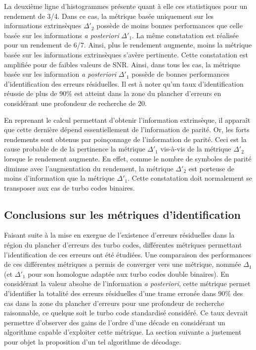 La deuxième ligne d'histogrammes présente quant à elle ces statistiques  pour un rendement de 3/4. Dans ce cas, la 
métrique basée uniquement sur les informations extrinsèques $\Delta'_2$ possède de moins bonnes performances que celle basée sur les 
informations \textit{a posteriori} $\Delta'_1$. La même constatation est réalisée pour un rendement de 6/7. Ainsi, plus le rendement 
augmente, moins la métrique basée sur les informations extrinsèques s'avère pertinente. Cette constatation est amplifiée pour 
de faibles valeurs de SNR. Ainsi, dans tous les cas, la métrique basée sur les information \textit{a posteriori} $\Delta'_1$
possède de bonnes performances d'identification des erreurs résiduelles. Il est à noter qu'un taux d'identification réussie de plus de 
90\% est atteint dans la zone du plancher d'erreurs en considérant une profondeur de recherche de 20. 

En reprenant le calcul permettant d'obtenir l'information extrinsèque, il apparaît que cette dernière dépend 
essentiellement de l'information de parité. Or, les forts rendements sont obtenus par poinçonnage 
de l'information de parité. Ceci est la cause probable de de la pertinence la métrique $\Delta'_1$ vis-à-vis de la
métrique $\Delta'_2$ lorsque le rendement augmente. En effet, comme le nombre de symboles de parité diminue avec l'augmentation 
du rendement, la métrique $\Delta'_2$ est porteuse de moins d'information que la métrique $\Delta'_1$. Cette constatation 
doit normalement se transposer aux cas de turbo codes binaires.

\subsection{Conclusions sur les métriques d'identification}
Faisant suite à la mise en exergue de l'existence d'erreurs résiduelles dans la région du plancher d'erreurs des turbo codes,
différentes métriques permettant l'identification de ces erreurs ont été étudiées. Une comparaison des performances de ces 
différentes métriques a permis de converger vers une métrique, nommée $\Delta_1$ (et $\Delta'_1$ pour son homologue 
adaptée aux turbo codes double binaires). En considérant la valeur absolue de l'information \textit{a posteriori}, cette
métrique permet d'identifier la totalité des erreurs résiduelles d'une trame erronée dans 90\% des cas dans la zone du plancher 
d'erreurs pour une profondeur de recherche raisonnable, ce quelque soit le turbo code standardisé considéré. Ce taux devrait
permettre d'observer des gains de l'ordre d'une décade en considérant un algorithme capable d'exploiter cette métrique. 
La section suivante a justement pour 
objet la proposition d'un tel algorithme de décodage.

